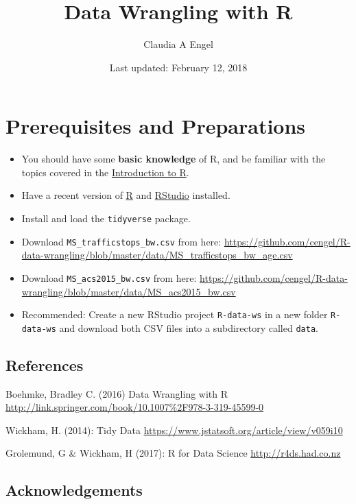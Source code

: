 \documentclass[]{book}
\title{Data Wrangling with R}
\author{Claudia A Engel}
\date{Last updated: February 12, 2018}
\providecommand{\tightlist}{%
  \setlength{\itemsep}{0pt}\setlength{\parskip}{0pt}}
\theoremstyle{definition}
\theoremstyle{definition}
\theoremstyle{definition}
\theoremstyle{remark}
\begin{document}
\maketitle

{
\setcounter{tocdepth}{1}
\tableofcontents
}
\chapter*{Prerequisites and
Preparations}\label{prerequisites-and-preparations}

\begin{itemize}
\tightlist
\item
  You should have some \textbf{basic knowledge} of R, and be familiar
  with the topics covered in the
  \href{https://cengel.github.io/R-intro/}{Introduction to R}.
\item
  Have a recent version of \href{https://cran.r-project.org/}{R} and
  \href{https://www.rstudio.com/}{RStudio} installed.
\item
  Install and load the \texttt{tidyverse} package.
\item
  Download \texttt{MS\_trafficstops\_bw.csv} from here:
  \url{https://github.com/cengel/R-data-wrangling/blob/master/data/MS_trafficstops_bw_age.csv}
\item
  Download \texttt{MS\_acs2015\_bw.csv} from here:
  \url{https://github.com/cengel/R-data-wrangling/blob/master/data/MS_acs2015_bw.csv}
\item
  Recommended: Create a new RStudio project \texttt{R-data-ws} in a new
  folder \texttt{R-data-ws} and download both CSV files into a
  subdirectory called \texttt{data}.
\end{itemize}

\section*{References}\label{references}

Boehmke, Bradley C. (2016) Data Wrangling with R
\url{http://link.springer.com/book/10.1007\%2F978-3-319-45599-0}

Wickham, H. (2014): Tidy Data
\url{https://www.jstatsoft.org/article/view/v059i10}

Grolemund, G \& Wickham, H (2017): R for Data Science
\url{http://r4ds.had.co.nz}

\section*{Acknowledgements}\label{acknowledgements}
\end{document}
